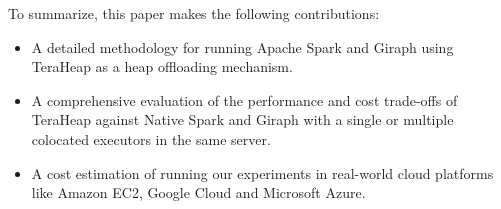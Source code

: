 To summarize, this paper makes the following contributions: 
\begin{itemize}
    \item{A detailed methodology for running Apache Spark and Giraph
        using TeraHeap as a heap offloading mechanism.}

    \item{A comprehensive evaluation of the performance and cost
        trade-offs of TeraHeap against Native Spark and Giraph with a
        single or multiple colocated executors in the same server.}

    \item{A cost estimation of running our experiments in real-world
        cloud platforms like Amazon EC2, Google Cloud and Microsoft
        Azure.}
\end{itemize}
